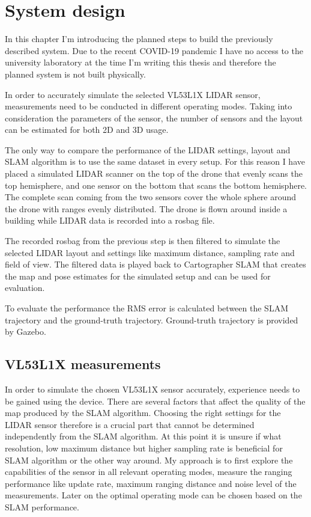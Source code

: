 \chapter{System design} \label{chap:system_design}
In this chapter I'm introducing the planned steps to build the previously described system. Due to the 
recent COVID-19 pandemic I have no access to the university laboratory at the time I'm writing this thesis and 
therefore the planned system is not built physically. 

In order to accurately simulate the selected VL53L1X LIDAR sensor, measurements need to be conducted in different 
operating modes. Taking into consideration the parameters of the sensor, the number of sensors and the layout 
can be estimated for both 2D and 3D usage.

The only way to compare the performance of the LIDAR settings, layout and SLAM algorithm is to use the same
dataset in every setup. For this reason I have placed a simulated LIDAR scanner on the top of the drone 
that evenly scans the top hemisphere, and one sensor on the bottom that scans the bottom hemisphere. 
The complete scan coming from the two sensors cover the whole sphere around the drone with ranges evenly
distributed. The drone is flown around inside a building while LIDAR data is recorded into a rosbag file.

The recorded rosbag from the previous step is then filtered to simulate the selected LIDAR layout and settings
like maximum distance, sampling rate and field of view. The filtered data is played back to Cartographer SLAM
that creates the map and pose estimates for the simulated setup and can be used for evaluation.

To evaluate the performance the RMS error is calculated between the SLAM trajectory and the ground-truth
trajectory. Ground-truth trajectory is provided by Gazebo.



\section{VL53L1X measurements} \label{sect:vl53l1x_measurements}
In order to simulate the chosen VL53L1X sensor accurately, experience needs to be gained using the device. 
There are several factors that affect the quality of the map produced by the SLAM algorithm. Choosing the right
settings for the LIDAR sensor therefore is a crucial part that cannot be determined independently from the SLAM 
algorithm. At this point it is unsure if what resolution, low maximum distance but higher sampling rate is beneficial 
for SLAM algorithm or the other way around. My approach is to first explore the capabilities of the sensor in 
all relevant operating modes, measure the ranging performance like update rate, maximum ranging distance and 
noise level of the measurements. Later on the optimal operating mode can be chosen based on the SLAM performance. 

